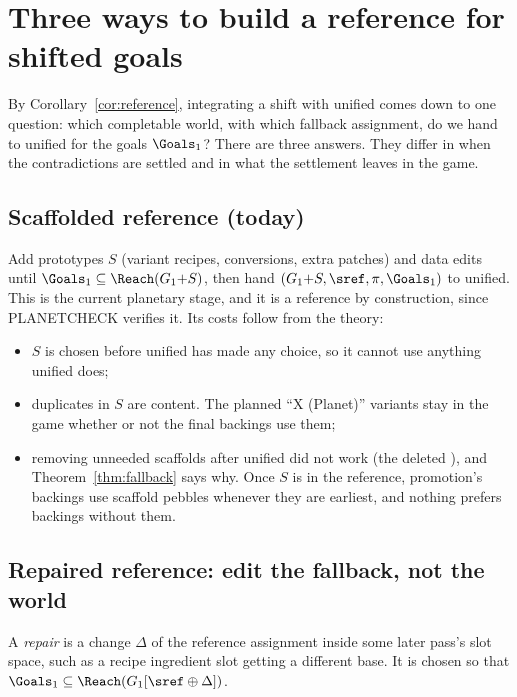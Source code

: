 \section{Three ways to build a reference for shifted goals}\label{sec:constructions}

By Corollary~\ref{cor:reference}, integrating a shift with unified comes down to one question: which completable world, with which fallback assignment, do we hand to unified for the goals $\Goals_1$? There are three answers. They differ in when the contradictions are settled and in what the settlement leaves in the game.

\subsection{Scaffolded reference (today)}

Add prototypes $S$ (variant recipes, conversions, extra patches) and data edits until $\Goals_1\subseteq\Reach(G_1{+}S)$, then hand $(G_1{+}S,\sref,\pi,\Goals_1)$ to unified. This is the current planetary stage, and it is a reference by construction, since PLANETCHECK verifies it. Its costs follow from the theory:
\begin{itemize}[nosep]
\item $S$ is chosen before unified has made any choice, so it cannot use anything unified does;
\item duplicates in $S$ are content. The planned ``X (Planet)'' variants stay in the game whether or not the final backings use them;
\item removing unneeded scaffolds after unified did not work (the deleted ), and Theorem~\ref{thm:fallback} says why. Once $S$ is in the reference, promotion's backings use scaffold pebbles whenever they are earliest, and nothing prefers backings without them.
\end{itemize}

\subsection{Repaired reference: edit the fallback, not the world}

\begin{definition}[Repair]
A \emph{repair} is a change $\Delta$ of the reference assignment inside some later pass's slot space, such as a recipe ingredient slot getting a different base. It is chosen so that $\Goals_1\subseteq\Reach(G_1[\sref\oplus\Delta])$.
\end{definition}

